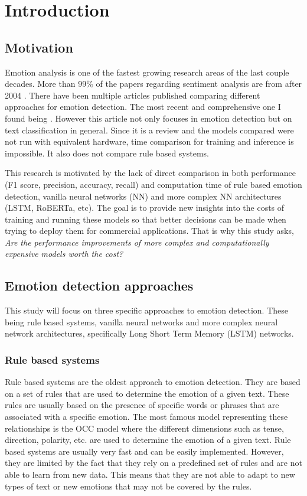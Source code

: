 \chapter{Introduction}

\section{Motivation}

Emotion analysis is one of the fastest growing research areas of the last
couple
decades. More than 99\% of the papers regarding sentiment analysis are from
after 2004 \cite{MANTYLA201816}. There have been multiple articles published
comparing different approaches for emotion detection. The most recent and
comprehensive one I found being \cite{REUSENS2024124302}. However this article
not only focuses in emotion detection but on text classification in general.
Since it is a review and the models compared were not run with equivalent
hardware, time comparison for training and inference is impossible. It also
does not compare rule based systems.

This research is motivated by the lack of direct comparison in both performance
(F1 score, precision, accuracy, recall) and computation time of rule based
emotion detection, vanilla neural networks (NN) and more complex NN
architectures (LSTM, RoBERTa, etc). The goal is to provide new insights into
the costs of training and running these models so that better decisions can be
made when trying to deploy them for commercial applications. That is why this
study asks, \textit{Are the performance improvements of more complex and
    computationally expensive models worth the cost?}

\section{Emotion detection approaches}

This study will focus on three specific approaches to emotion detection. These
being rule based systems, vanilla neural networks and more complex neural
network architectures, specifically Long Short Term Memory (LSTM) networks.

\subsection{Rule based systems}

Rule based systems are the oldest approach to emotion detection. They are based
on a set of rules that are used to determine the emotion of a given text. These
rules are usually based on the presence of specific words or phrases that are
associated with a specific emotion. The most famous model representing these
relationships is the OCC model \cite{ortony2022cognitive} where the different
dimensions such as tense, direction, polarity, etc. are used to determine the
emotion of a given text. Rule based systems are usually very fast and can be
easily implemented. However, they are limited by the fact that they rely on a
predefined set of rules and are not able to learn from new data. This means
that they are not able to adapt to new types of text or new emotions that may
not be covered by the rules.

